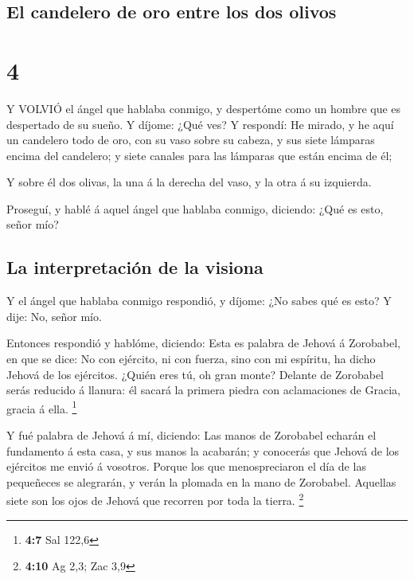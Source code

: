 \hypertarget{el-candelero-de-oro-entre-los-dos-olivos}{%
\subsection{El candelero de oro entre los dos
olivos}\label{el-candelero-de-oro-entre-los-dos-olivos}}

\hypertarget{section-3}{%
\section{4}\label{section-3}}

 Y VOLVIÓ el ángel que hablaba conmigo, y despertóme como un
hombre que es despertado de su sueño.  Y díjome: ¿Qué ves? Y
respondí: He mirado, y he aquí un candelero todo de oro, con su vaso
sobre su cabeza, y sus siete lámparas encima del candelero; y siete
canales para las lámparas que están encima de él;

 Y sobre él dos olivas, la una á la derecha del vaso, y la
otra á su izquierda.

 Proseguí, y hablé á aquel ángel que hablaba conmigo,
diciendo: ¿Qué es esto, señor mío?

\hypertarget{la-interpretaciuxf3n-de-la-visiona}{%
\subsection{La interpretación de la
visiona}\label{la-interpretaciuxf3n-de-la-visiona}}

 Y el ángel que hablaba conmigo respondió, y díjome: ¿No
sabes qué es esto? Y dije: No, señor mío.

 Entonces respondió y hablóme, diciendo: Esta es palabra de
Jehová á Zorobabel, en que se dice: No con ejército, ni con fuerza, sino
con mi espíritu, ha dicho Jehová de los ejércitos.  ¿Quién
eres tú, oh gran monte? Delante de Zorobabel serás reducido á llanura:
él sacará la primera piedra con aclamaciones de Gracia, gracia á ella.
\footnote{\textbf{4:7} Sal 122,6}

 Y fué palabra de Jehová á mí, diciendo:  Las
manos de Zorobabel echarán el fundamento á esta casa, y sus manos la
acabarán; y conocerás que Jehová de los ejércitos me envió á vosotros.
 Porque los que menospreciaron el día de las pequeñeces se
alegrarán, y verán la plomada en la mano de Zorobabel. Aquellas siete
son los ojos de Jehová que recorren por toda la tierra. \footnote{\textbf{4:10}
  Ag 2,3; Zac 3,9}

